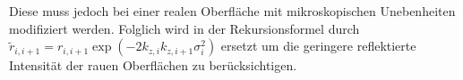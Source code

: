 Diese muss jedoch bei einer realen Oberfläche mit mikroskopischen Unebenheiten modifiziert werden. Folglich wird in der
Rekursionsformel durch $\tilde{r}_{i, i+1}=r_{i, i+1} \exp \left(-2 k_{z, i} k_{z, i+1} \sigma_{i}^{2}\right)$ ersetzt um die geringere reflektierte
Intensität der rauen Oberflächen zu berücksichtigen.